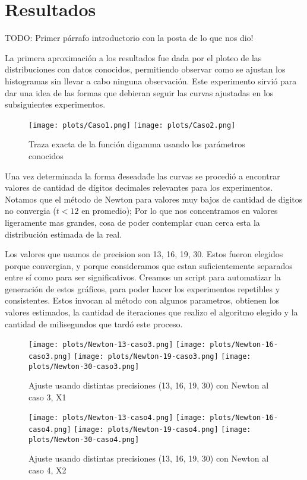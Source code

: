 \section{Resultados}

TODO: Primer p\'arrafo introductorio con la posta de lo que nos dio!

La primera aproximaci\'on a los resultados fue dada por el ploteo de las distribuciones con datos conocidos, permitiendo observar como se ajustan los histogramas sin llevar a cabo ninguna observaci\'on. Este experimento sirvi\'o para dar una idea de las formas que debieran seguir las curvas ajustadas en los subsiguientes experimentos.

\begin{figure} [H]
\begin {center}
\texttt{[image: plots/Caso1.png]}
\texttt{[image: plots/Caso2.png]}
\end {center}
\caption{Traza exacta de la funci\'on digamma usando los par\'ametros conocidos}
\label{fig:FitCaso3Newton}
\end{figure}

Una vez determinada la forma \"deseada\" de las curvas se procedi\'o a encontrar valores de cantidad de d\'igitos decimales relevantes para los experimentos. Notamos que el m\'etodo de Newton para valores muy bajos de cantidad de digitos no convergia ($t < 12$ en promedio); Por lo que nos concentramos en valores
ligeramente mas grandes, cosa de poder contemplar cuan cerca esta la distribuci\'on estimada de la real.

Los valores que usamos de precision son 13, 16, 19, 30. Estos fueron elegidos porque convergian, y porque consideramos que estan
suficientemente separados entre s\'i como para ser significativos. Creamos un script para automatizar la generaci\'on de estos gr\'aficos,
para poder hacer los experimentos repetibles y consistentes. Estos invocan al m\'etodo con algunos parametros, obtienen los
valores estimados, la cantidad de iteraciones que realizo el algoritmo elegido y la cantidad de milisegundos que tard\'o este proceso.


\begin{figure} [H]

\texttt{[image: plots/Newton-13-caso3.png]}
\texttt{[image: plots/Newton-16-caso3.png]}
\texttt{[image: plots/Newton-19-caso3.png]}
\texttt{[image: plots/Newton-30-caso3.png]}

\caption{Ajuste usando distintas precisiones (13, 16, 19, 30) con Newton al caso 3, X1}
\label{fig:FitCaso3Newton}
\end{figure}

\begin{figure} [H]

\texttt{[image: plots/Newton-13-caso4.png]}
\texttt{[image: plots/Newton-16-caso4.png]}
\texttt{[image: plots/Newton-19-caso4.png]}
\texttt{[image: plots/Newton-30-caso4.png]}

\caption{Ajuste usando distintas precisiones (13, 16, 19, 30) con Newton al caso 4, X2}
\label{fig:FitCaso4Newton}
\end{figure}
